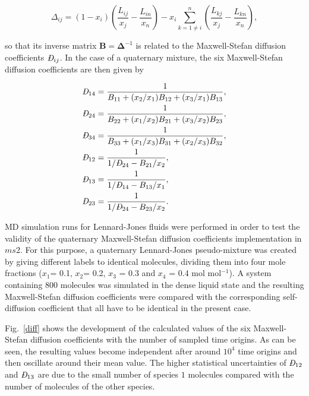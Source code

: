 \documentclass[preprint,12pt]{elsarticle}
\begin{document}
\begin{equation}
 \Delta_{ij} = (1-x_i)\left(\frac{L_{ij}}{x_j}-\frac{L_{in}}{x_n}\right)-x_i\sum^{n}_{k=1\neq i}\left(\frac{L_{kj}}{x_j}-\frac{L_{kn}}{x_n}\right),
\end{equation} 

\noindent so that its inverse matrix $\bm{B} = \bm{\Delta}^{-1}$ is related to the Maxwell-Stefan diffusion coefficients $\textit{\DJ}_{ij}$. In the case of a quaternary mixture, the six Maxwell-Stefan diffusion coefficients are then given by~\cite{kri05b}

\begin{align}
{\textit{\DJ}_{14}}&=\frac{1}{B_{11}+(x_2/x_1)B_{12}+(x_3/x_1)B_{13}},\\
{\textit{\DJ}_{24}}&=\frac{1}{B_{22}+(x_1/x_2)B_{21}+(x_3/x_2)B_{23}},\\
{\textit{\DJ}_{34}}&=\frac{1}{B_{33}+(x_1/x_3)B_{31}+(x_2/x_3)B_{32}},\\
{\textit{\DJ}_{12}}&= \frac{1}{1/{\textit{\DJ}_{24}}-B_{21}/{x_2}},\\
{\textit{\DJ}_{13}}&= \frac{1}{1/{\textit{\DJ}_{14}}-B_{13}/{x_1}},\\
{\textit{\DJ}_{23}}&= \frac{1}{1/{\textit{\DJ}_{24}}-B_{23}/{x_2}}.\\
\end{align}

MD simulation runs for Lennard-Jones fluids were performed in order to test the validity of the quaternary Maxwell-Stefan diffusion coefficients implementation in $ms2$. For this purpose, a quaternary Lennard-Jones pseudo-mixture was created by giving different labels to identical molecules, dividing them into four mole fractions ($x_1$= 0.1, $x_2$= 0.2, $x_3$ = 0.3 and $x_4$ = 0.4 mol mol$^{-1}$). A system containing 800 molecules was simulated in the dense liquid state and the resulting Maxwell-Stefan diffusion coefficients were compared with the corresponding self-diffusion coefficient that all have to be identical in the present case.

Fig.~\ref{diff} shows the development of the calculated values of the six Maxwell-Stefan diffusion coefficients with the number of sampled time origins. As can be seen, the resulting values become independent after around $10^4$ time origins and then oscillate around their mean value. The higher statistical uncertainties of ${\textit{\DJ}_{12}}$  and ${\textit{\DJ}_{13}}$ are due to the small number of species $1$ molecules compared with the number of molecules of the other species.
\end{document}
